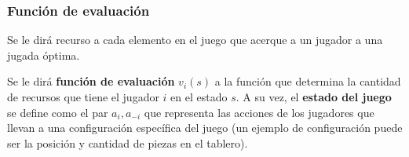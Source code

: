 \subsubsection{Función de evaluación}
  \begin{definition}
    Se le dirá recurso a cada elemento en el juego que acerque a un jugador a una jugada óptima.
  \end{definition}

  Se le dirá \textbf{función de evaluación}\cite{EvaluationFunction2022} \(v_i(s)\) a la función 
  que determina la cantidad de recursos que tiene el jugador \(i\) en el estado \(s\).
  A su vez, el \textbf{estado del juego} se define como el par \(a_i, a_{-i}\) que representa las
  acciones de los jugadores que llevan a una configuración específica del juego (un ejemplo de
  configuración puede ser la posición y cantidad de piezas en el tablero).